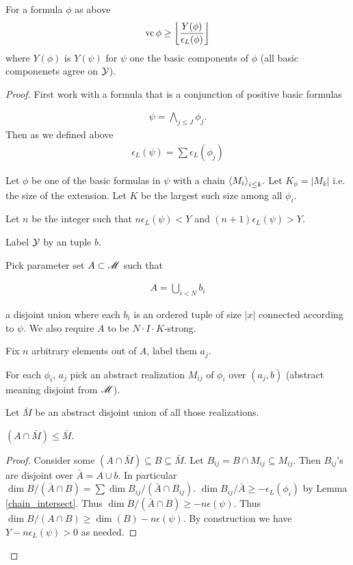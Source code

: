 \begin{Theorem}
  For a formula $\phi$ as above
  \begin{align*}
    \operatorname{vc} \phi \geq \left \lfloor \frac{Y(\phi)}{\epsilon_L(\phi)} \right \rfloor
  \end{align*}
  where $Y(\phi)$ is $Y(\psi)$ for $\psi$ one the basic components of $\phi$ (all basic componenets agree on $\mathcal Y$).
\end{Theorem}

\begin{proof}
  First work with a formula that is a conjunction of positive basic formulas

  \begin{align*}
    \psi = \bigwedge_{j \leq J} \phi_j.
  \end{align*}
  Then as we defined above
  \begin{align*}
    \epsilon_L(\psi) = \sum \epsilon_L(\phi_j)
  \end{align*}
  
  Let $\phi$ be one of the basic formulas in $\psi$ with a chain $\left\langle M_i \right\rangle_{i \leq k}$.
  Let $K_\phi = |M_k|$ i.e. the size of the extension.
  Let $K$ be the largest such size among all $\phi_i$.

  Let $n$ be the integer such that $n \epsilon_L(\psi) < Y$ and $(n+1) \epsilon_L(\psi) > Y$.

  Label $\mathcal Y$ by an tuple $b$.

  Pick parameter set $A \subset \mathscr M$ such that 

  \begin{align*}
    A = \bigcup_{i<N} b_i
  \end{align*}

  a disjoint union where each $b_i$ is an ordered tuple of size $|x|$ connected according to $\psi$.
  We also require $A$ to be $N \cdot I \cdot K$-strong.

  Fix $n$ arbitrary elements out of $A$, label them $a_j$.

  For each $\phi_i$, $a_j$ pick an abstract realization $M_{ij}$ of $\phi_i$ over $(a_j, b)$
  (abstract meaning disjoint from $\mathscr M$).
  
  Let $\bar M$ be an abstract disjoint union of all those realizations.

  \begin{Claim}
    $(A \cap \bar M) \leq \bar M$.
  \end{Claim}
  \begin{proof}
    Consider some $(A \cap \bar M) \subseteq B \subseteq \bar M$.
    Let $B_{ij} = B \cap M_{ij} \subseteq M_{ij}$.
    Then $B_{ij}$'s are disjoint over $\bar A = A \cup b$.
    In particular $\dim B / (\bar A \cap B) = \sum \dim B_{ij} / (\bar A \cap B_{ij})$.
    $\dim B_{ij} / \bar A \geq -\epsilon_L(\phi_i)$ by Lemma \ref{chain_intersect}.
    Thus $\dim B / (\bar A \cap B) \geq -n\epsilon(\psi)$.
    Thus $\dim B / (A \cap B) \geq \dim(B) - n\epsilon(\psi)$.
    By construction we have $Y - n\epsilon_L(\psi) > 0$ as needed.
  \end{proof}


\end{proof}
